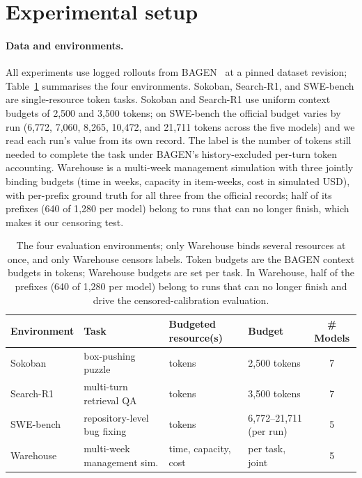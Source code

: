 \section{Experimental setup}
\label{sec:setup}

\paragraph{Data and environments.}
All experiments use logged rollouts from BAGEN~\cite{lin2026bagen} at a pinned dataset revision; Table~\ref{tab:envs} summarises the four environments. Sokoban, Search-R1, and SWE-bench are single-resource token tasks. Sokoban and Search-R1 use uniform context budgets of 2{,}500 and 3{,}500 tokens; on SWE-bench the official budget varies by run (6{,}772, 7{,}060, 8{,}265, 10{,}472, and 21{,}711 tokens across the five models) and we read each run's value from its own record. The label is the number of tokens still needed to complete the task under BAGEN's history-excluded per-turn token accounting. Warehouse is a multi-week management simulation with three jointly binding budgets (time in weeks, capacity in item-weeks, cost in simulated USD), with per-prefix ground truth for all three from the official records; half of its prefixes (640 of 1{,}280 per model) belong to runs that can no longer finish, which makes it our censoring test.

\begin{table}[t]
\centering
\caption{The four evaluation environments; only Warehouse binds several resources at once, and only Warehouse censors labels. Token budgets are the BAGEN context budgets in tokens; Warehouse budgets are set per task. In Warehouse, half of the prefixes (640 of 1{,}280 per model) belong to runs that can no longer finish and drive the censored-calibration evaluation.}
\label{tab:envs}
\small
\begin{tabular}{@{}llllc@{}}
\toprule
Environment & Task & Budgeted resource(s) & Budget & \# Models \\
\midrule
Sokoban & box-pushing puzzle & tokens & 2{,}500 tokens & 7 \\
Search-R1 & multi-turn retrieval QA & tokens & 3{,}500 tokens & 7 \\
SWE-bench & repository-level bug fixing & tokens & 6{,}772--21{,}711 (per run) & 5 \\
Warehouse & multi-week management sim. & time, capacity, cost & per task, joint & 5 \\
\bottomrule
\end{tabular}
\end{table}

